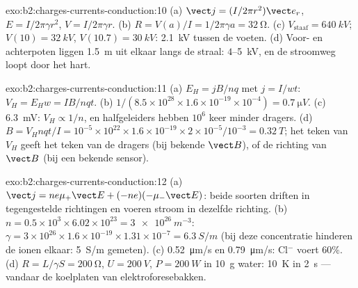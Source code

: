 \begin{solution}{exo:b2:charges-currents-conduction:10}
(a) $\vect j = (I/2\pi r^2)\vect e_r$, $E = I/2\pi\gamma r^2$,
$V = I/2\pi\gamma r$. (b) $R = V(a)
/I = 1/2\pi\gamma a = \qty{32}{\ohm}$.
(c) $V_{\text{staaf}} = \qty{640}{kV}$; $V(10) = \qty{32}{kV}$,
$V(10.7) = \qty{30}{kV}$: \qty{2.1}{kV} tussen de voeten. (d) Voor- en
achterpoten liggen \qty{1.5}{m} uit elkaar langs de straal:
$4$--\qty{5}{kV}, en de stroomweg loopt door het hart.
\end{solution}

\begin{solution}{exo:b2:charges-currents-conduction:11}
(a) $E_H = jB/nq$ met $j = I/wt$: $V_H = E_Hw = IB/nqt$. (b)
$1/(8.5 \times 10^{28}
\times 1.6 \times 10^{-19} \times 10^{-4}) = \qty{0.7}{\micro V}$.
(c) \qty{6.3}{mV}: $V_H \propto 1/n$, en halfgeleiders hebben $10^6$ keer
minder dragers. (d)
$B = V_Hnqt/I =
10^{-5} \times 10^{22} \times 1.6 \times 10^{-19} \times 2 \times 10^{-5}/10^{-3} = \qty{0.32}{T}$;
het teken van $V_H$ geeft het teken van de dragers (bij bekende $\vect B$),
of de richting van $\vect B$ (bij een bekende sensor).
\end{solution}

\begin{solution}{exo:b2:charges-currents-conduction:12}
(a) $\vect j = ne\mu_+\vect E + (-ne)(-\mu_-\vect E)$: beide soorten driften
in tegengestelde richtingen en voeren stroom in dezelfde richting. (b)
$n =
0.5 \times 10^3 \times 6.02 \times 10^{23} = \qty{3e26}{m^{-3}}$:
$\gamma = 3 \times 10^{26} \times 1.6 \times 10^{-19}
\times 1.31 \times 10^{-7} = \qty{6.3}{S/m}$
(bij deze concentratie hinderen de ionen elkaar: \qty{5}{S/m} gemeten). (c)
\qty{0.52}{\micro m/s} en \qty{0.79}{\micro m/s}: Cl$^-$ voert $60\%$. (d)
$R = L/\gamma S = \qty{200}{\ohm}$, $U = \qty{200}{V}$, $P =
\qty{200}{W}$
in \qty{10}{g} water: \qty{10}{K} in \qty{2}{s} --- vandaar de koelplaten
van elektroforesebakken.
\end{solution}

